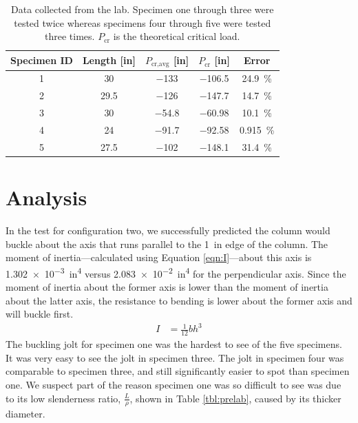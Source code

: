 \documentclass[12 pt]{article}
\begin{document}
\begin{table}[!htbp]
\caption{Data collected from the lab. Specimen one through three were tested twice whereas specimens four through five were tested three times. $P_\text{cr}$ is the theoretical critical load.}
\begin{center}
	\begin{tabular}{|c|c|c|c|c|}
		\hline
		Specimen ID&Length [\unit{in}]&$P_\text{cr,avg}$ [\unit{in}]&$P_\text{cr}$ [\unit{in}]&Error\\
		\hline
		\num{1}&\num{30}&\num{-133}&\num{-106.5}&\qty{24.9}{\percent}\\
		\hline
		\num{2}&\num{29.5}&\num{-126}&\num{-147.7}&\qty{14.7}{\percent}\\
		\hline
		\num{3}&\num{30}&\num{-54.8}&\num{-60.98}&\qty{10.1}{\percent}\\
		\hline
		\num{4}&\num{24}&\num{-91.7}&\num{-92.58}&\qty{0.915}{\percent}\\
		\hline
		\num{5}&\num{27.5}&\num{-102}&\num{-148.1}&\qty{31.4}{\percent}\\
		\hline
	\end{tabular}
\end{center}
\label{tbl:data}
\end{table}

\section{Analysis} \label{analysis}
In the test for configuration two, we successfully predicted the column would buckle about the axis that runs parallel to the \qty{1}{in} edge of the column. The moment of inertia---calculated using Equation \ref{eqn:I}---about this axis is \qty{1.302e-3}{in^4} versus \qty{2.083e-2}{in^4} for the perpendicular axis. Since the moment of inertia about the former axis is lower than the moment of inertia about the latter axis, the resistance to bending is lower about the former axis and will buckle first.
\begin{align}
	I&=\frac{1}{12}bh^3\label{eqn:I}
\end{align}
The buckling jolt for specimen one was the hardest to see of the five specimens. It was very easy to see the jolt in specimen three. The jolt in specimen four was comparable to specimen three, and still significantly easier to spot than specimen one. We suspect part of the reason specimen one was so difficult to see was due to its low slenderness ratio, $\frac{L}{\rho}$, shown in Table \ref{tbl:prelab}, caused by its thicker diameter.
\end{document}
